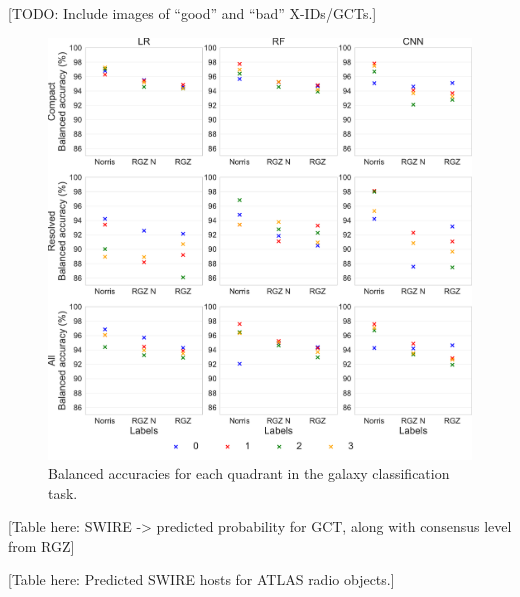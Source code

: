 \documentclass[fleqn,usenatbib,usedcolumn]{mnras}
\begin{document}
  {[}TODO: Include images of ``good'' and ``bad'' X-IDs/GCTs.{]}

  \begin{figure}
  \centering
  \includegraphics[width=\columnwidth]{atlas-ml-ba-grid.pdf}
  \caption{Balanced accuracies for each quadrant in the galaxy
  classification task.\label{fig:ba}}
  \end{figure}

  {[}Table here: SWIRE -\textgreater{} predicted probability for GCT,
  along with consensus level from RGZ{]}

  {[}Table here: Predicted SWIRE hosts for ATLAS radio objects.{]}
\end{document}
